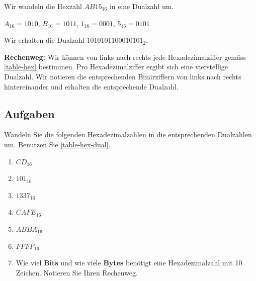 \begin{example}

Wir wandeln die Hexzahl $AB15_{16}$ in eine Dualzahl um.

\begin{center}
$A_{16} = 1010$, $B_{16} = 1011$, $1_{16} = 0001$, $5_{16} = 0101$
\end{center}

Wir erhalten die Dualzahl $1010101100010101_{2}$.

\end{example}

\textbf{Rechenweg:} Wir können von links nach rechts jede Hexadezimalziffer gemäss \autoref{table-hex} bestimmen. Pro Hexadezimalziffer ergibt sich eine vierstellige Dualzahl. Wir notieren die entsprechenden Binärziffern von links nach rechts hintereinander und erhalten die entsprechende Dualzahl.

\subsection{Aufgaben}
\label{subsection-hex2dual-aufgaben}

Wandeln Sie die folgenden Hexadezimalzahlen in die entsprechenden Dualzahlen um. Benutzen Sie \autoref{table-hex-dual}.

\begin{table}[htb]
\centering
{}
\caption{Codierungen der Hexadezimalzahlen in den Dualcode.}
\label{table-hex-dual}
\end{table}

\begin{enumerate}
\item $CD_{16}$
\fillwithgrid{0.25in}
\item $101_{16}$
\fillwithgrid{0.25in}
\item $1337_{16}$
\fillwithgrid{0.25in}
\item $CAFE_{16}$
\fillwithgrid{0.25in}
\item $ABBA_{16}$
\fillwithgrid{0.25in}
\item $FFFF_{16}$
\fillwithgrid{0.25in}
\item Wie viel \textbf{Bits} und wie viele \textbf{Bytes} benötigt eine Hexadezimalzahl mit \num{10} Zeichen. Notieren Sie Ihren Rechenweg.
\fillwithgrid{1in}
\end{enumerate}

